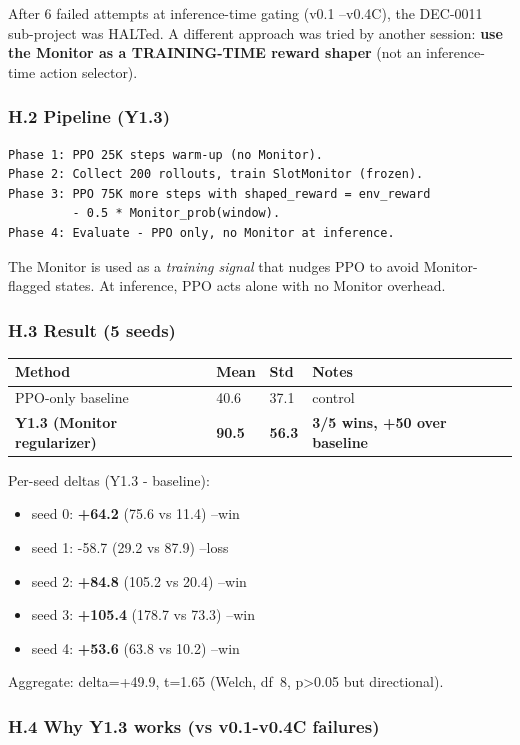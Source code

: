 \documentclass[11pt]{article}
\begin{document}
After 6 failed attempts at inference-time gating (v0.1 --v0.4C), the
DEC-0011 sub-project was HALTed. A different approach was tried by another
session: \textbf{use the Monitor as a TRAINING-TIME reward shaper} (not an
inference-time action selector).

\subsubsection{H.2 Pipeline (Y1.3)}

\begin{verbatim}
Phase 1: PPO 25K steps warm-up (no Monitor).
Phase 2: Collect 200 rollouts, train SlotMonitor (frozen).
Phase 3: PPO 75K more steps with shaped_reward = env_reward
         - 0.5 * Monitor_prob(window).
Phase 4: Evaluate - PPO only, no Monitor at inference.
\end{verbatim}

The Monitor is used as a \textit{training signal} that nudges PPO to avoid
Monitor-flagged states. At inference, PPO acts alone with no Monitor
overhead.

\subsubsection{H.3 Result (5 seeds)}

\begin{tabular}{llll}
Method & Mean & Std & Notes \\
\hline
PPO-only baseline & 40.6 & 37.1 & control \\
\textbf{Y1.3 (Monitor regularizer)} & \textbf{90.5} & \textbf{56.3} & \textbf{3/5 wins, +50 over baseline} \\
\end{tabular}


Per-seed deltas (Y1.3 - baseline):
\begin{itemize}
  \item seed 0: \textbf{+64.2} (75.6 vs 11.4) --win
  \item seed 1: -58.7 (29.2 vs 87.9) --loss
  \item seed 2: \textbf{+84.8} (105.2 vs 20.4) --win
  \item seed 3: \textbf{+105.4} (178.7 vs 73.3) --win
  \item seed 4: \textbf{+53.6} (63.8 vs 10.2) --win
\end{itemize}


Aggregate: delta=+49.9, t=1.65 (Welch, df~8, p>0.05 but directional).

\subsubsection{H.4 Why Y1.3 works (vs v0.1-v0.4C failures)}
\end{document}
